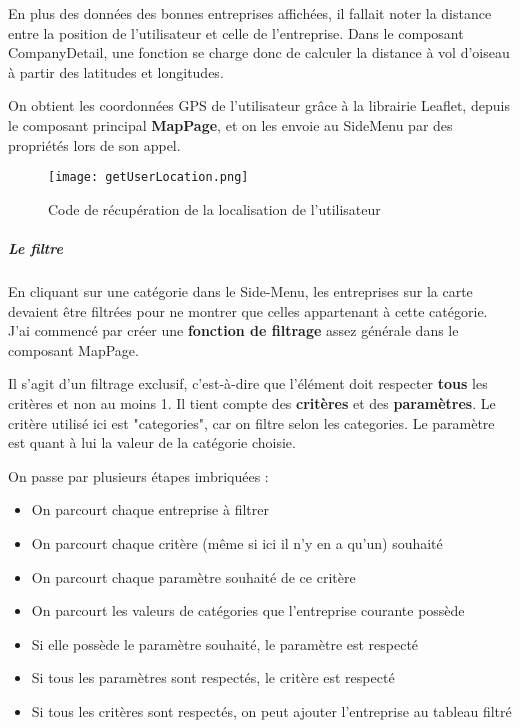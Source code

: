 En plus des données des bonnes entreprises affichées, il fallait noter la distance entre la position de l'utilisateur et celle de l'entreprise. 
Dans le composant CompanyDetail, une fonction se charge donc de calculer la distance à vol d'oiseau à partir des latitudes et longitudes.

On obtient les coordonnées GPS de l'utilisateur grâce à la librairie Leaflet, depuis le composant principal \textbf{MapPage}, et on les envoie au SideMenu par des propriétés lors de son appel.

\begin{figure}[H]
    \texttt{[image: getUserLocation.png]}
    \caption{Code de récupération de la localisation de l'utilisateur}
\end{figure}

\subparagraph{Le filtre}

En cliquant sur une catégorie dans le Side-Menu, les entreprises sur la carte devaient être filtrées pour ne montrer que celles appartenant à cette catégorie.\\
J'ai commencé par créer une \textbf{fonction de filtrage} assez générale dans le composant MapPage. 

Il s'agit d'un filtrage exclusif, c'est-à-dire que l'élément doit respecter \textbf{tous} les critères et non au moins 1.
Il tient compte des \textbf{critères} et des \textbf{paramètres}. Le critère utilisé ici est "categories", car on filtre selon les categories.
Le paramètre est quant à lui la valeur de la catégorie choisie.

On passe par plusieurs étapes imbriquées :
\begin{itemize}
    \item On parcourt chaque entreprise à filtrer
    \item On parcourt chaque critère (même si ici il n'y en a qu'un) souhaité
    \item On parcourt chaque paramètre souhaité de ce critère
    \item On parcourt les valeurs de catégories que l'entreprise courante possède
    \item Si elle possède le paramètre souhaité, le paramètre est respecté
    \item Si tous les paramètres sont respectés, le critère est respecté
    \item Si tous les critères sont respectés, on peut ajouter l'entreprise au tableau filtré
\end{itemize}

